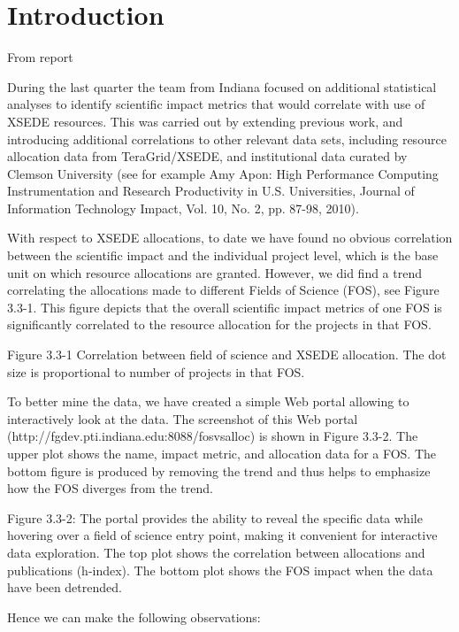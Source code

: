 \section{Introduction}

From report

During the last quarter the team from Indiana focused on additional statistical analyses to identify scientific impact metrics that would correlate with use of XSEDE resources.  This was carried out by extending previous work, and introducing additional correlations to other relevant data sets, including resource allocation data from TeraGrid/XSEDE, and institutional data curated by Clemson University (see for example Amy Apon: High Performance Computing Instrumentation and Research Productivity in U.S. Universities, Journal of Information Technology Impact, Vol. 10, No. 2, pp. 87-98, 2010).

With respect to XSEDE allocations, to date we have found no obvious correlation between the scientific impact and the individual project level, which is the base unit on which resource allocations are granted.  However, we did find a trend correlating the allocations made to different Fields of Science (FOS), see Figure 3.3-1. This figure depicts that the overall scientific impact metrics of one FOS is significantly correlated to the resource allocation for the projects in that FOS. 
 
Figure 3.3-1 Correlation between field of science and XSEDE allocation. The dot size is proportional to number of projects in that FOS.

To better mine the data, we have created a simple Web portal allowing to interactively look at the data. The screenshot of this Web portal (http://fgdev.pti.indiana.edu:8088/fosvsalloc) is shown in Figure 3.3-2.  The upper plot shows the name, impact metric, and allocation data for a FOS.  The bottom figure is produced by removing the trend and thus helps to emphasize how the FOS diverges from the trend. 

Figure 3.3-2: The portal provides the ability to reveal the specific data while hovering over a field of science entry point, making it convenient for interactive data exploration.  The top plot shows the correlation between allocations and publications (h-index).  The bottom plot shows the FOS impact when the data have been detrended.

Hence we can make the following observations:

